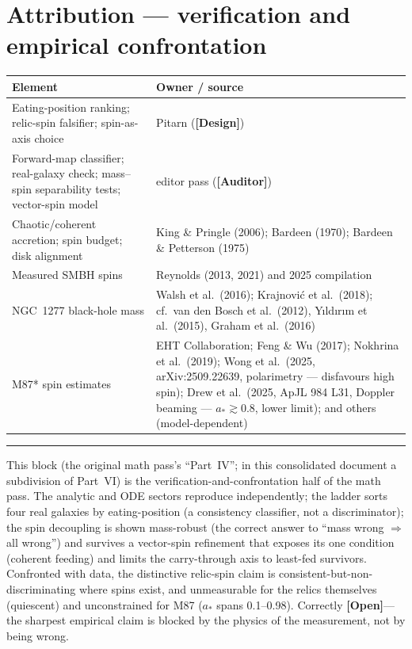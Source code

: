 \documentclass[11pt]{article}
\newcommand{\Design}{\textbf{\textcolor{purple!65!black}{[Design]}}}
\newcommand{\Open}{\textbf{\textcolor{gray!10!black}{[Open]}}}
\newcommand{\Auditor}{\textbf{\textcolor{teal!55!black}{[Auditor]}}}
\begin{document}
\section{Attribution --- verification and empirical confrontation}
\begin{center}\small
\begin{tabular}{@{}p{}p{}@{}}
\toprule
Element & Owner / source \\
\midrule
Eating-position ranking; relic-spin falsifier; spin-as-axis choice & Pitarn (\Design) \\
Forward-map classifier; real-galaxy check; mass--spin separability tests; vector-spin model & editor pass (\Auditor) \\
Chaotic/coherent accretion; spin budget; disk alignment & King \& Pringle (2006); Bardeen (1970); Bardeen \& Petterson (1975) \\
Measured SMBH spins & Reynolds (2013, 2021) and 2025 compilation \\
NGC~1277 black-hole mass & Walsh et al.\ (2016); Krajnovi\'c et al.\ (2018); cf.\ van den Bosch et al.\ (2012), Y\i ld\i r\i m et al.\ (2015), Graham et al.\ (2016) \\
M87* spin estimates & EHT Collaboration; Feng \& Wu (2017); Nokhrina et al.\ (2019); Wong et al.\ (2025, arXiv:2509.22639, polarimetry --- disfavours high spin); Drew et al.\ (2025, ApJL 984 L31, Doppler beaming --- $a_*\gtrsim0.8$, lower limit); and others (model-dependent) \\
\bottomrule
\end{tabular}
\end{center}

\vspace{4pt}\hrule\vspace{4pt}
{\small This block (the original math pass's ``Part~IV''; in this consolidated document a subdivision of Part~VI) is the verification-and-confrontation half of the math pass. The analytic and ODE sectors reproduce independently; the ladder sorts four real galaxies by eating-position (a consistency classifier, not a discriminator); the spin decoupling is shown mass-robust (the correct answer to ``mass wrong $\Rightarrow$ all wrong'') and survives a vector-spin refinement that exposes its one condition (coherent feeding) and limits the carry-through axis to least-fed survivors. Confronted with data, the distinctive relic-spin claim is consistent-but-non-discriminating where spins exist, and unmeasurable for the relics themselves (quiescent) and unconstrained for M87 ($a_\ast$ spans 0.1--0.98). Correctly \Open --- the sharpest empirical claim is blocked by the physics of the measurement, not by being wrong.}
\end{document}
